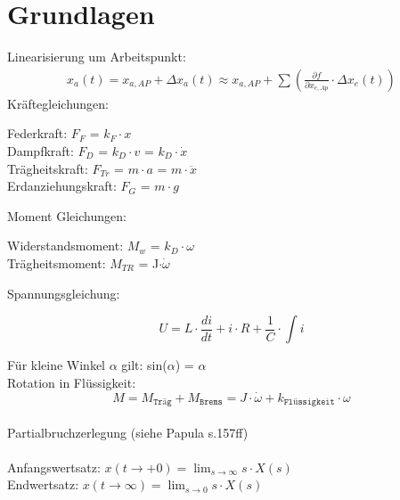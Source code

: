 \section{Grundlagen}
Linearisierung um Arbeitspunkt:
\begin{align*}
	x_{a}(t)=x_{a,AP}+\Delta x_{a}(t) \approx x_{a,AP}+\sum\left(\frac{\partial f}
	{\partial x_{e,Ap}} \cdot \Delta x_{e}(t)\right)
\end{align*}
Kräftegleichungen:
\begin{mdframed}[style=exercise]
	Federkraft: $F_F$ = $k_F \cdot x$\\
	Dampfkraft: $F_D$ = $k_D \cdot v$ = $k_D \cdot \dot{x}$\\
	Trägheitskraft: $F_{Tr}$ = $m\cdot a$ = $m\cdot \ddot{x}$\\
	Erdanziehungskraft: $F_G$ = $m\cdot g$
\end{mdframed}
Moment Gleichungen:
\begin{mdframed}[style=exercise]
	Widerstandsmoment: $M_w$ = $k_D \cdot \omega$\\
	Trägheitsmoment: $M_{TR}$ = J$\cdot \dot{\omega}$
\end{mdframed}
Spannungsgleichung:
\begin{mdframed}[style=exercise]
	\[
		U = L\cdot \frac{di}{dt}+i\cdot R+\frac{1}{C} \cdot \int i
	\]
\end{mdframed}
Für kleine Winkel $\alpha$ gilt: sin($\alpha$) = $\alpha$\\
Rotation in Flüssigkeit:
\[
	M=M_{\texttt{Träg}}+M_{\texttt{Brems}}=J \cdot \dot{\omega} +k_{\texttt{Flüssigkeit}} \cdot \omega
\]\\
Partialbruchzerlegung (siehe Papula s.157ff)\\
\\
Anfangswertsatz: $x(t \rightarrow +0)=\lim _{s \rightarrow \infty} s \cdot X(s)$\\
Endwertsatz: $x(t \rightarrow \infty)=\lim _{s \rightarrow 0} s \cdot X(s)$